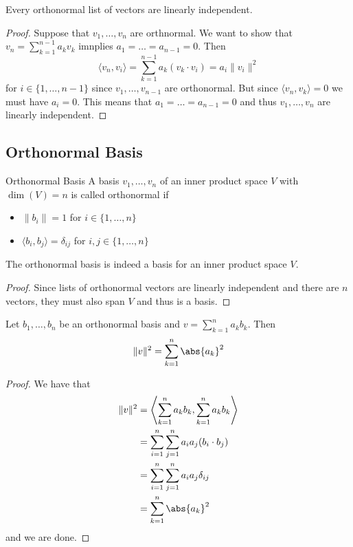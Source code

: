 \begin{prp}{}{} Every orthonormal list of vectors are linearly independent. \tcbline
\begin{proof}
Suppose that $v_1,\dots,v_n$ are orthnormal. We want to show that $v_n=\sum_{k=1}^{n-1}a_kv_k$ imnplies $a_1=\dots=a_{n-1}=0$. Then $$\langle v_n, v_i\rangle=\sum_{k=1}^{n-1}a_k(v_k\cdot v_i)=a_i\|v_i\|^2$$ for $i\in\{1,\dots,n-1\}$ since $v_1,\dots,v_{n-1}$ are orthonormal. But since $\langle v_n, v_k\rangle=0$ we must have $a_i=0$. This means that $a_1=\dots=a_{n-1}=0$ and thus $v_1,\dots,v_n$ are linearly independent. 
\end{proof}
\end{prp}

\subsection{Orthonormal Basis}
\begin{defn}{Orthonormal Basis}{} A basis $v_1,\dots,v_n$ of an inner product space $V$ with $\dim(V)=n$ is called orthonormal if 
\begin{itemize}
\item $\|b_i\|=1$ for $i\in\{1,\dots,n\}$
\item $\langle b_i,b_j\rangle=\delta_{ij}$ for $i,j\in\{1,\dots,n\}$
\end{itemize}
\end{defn}

\begin{prp}{}{} The orthonormal basis is indeed a basis for an inner product space $V$. \tcbline
\begin{proof}
Since lists of orthonormal vectors are linearly independent and there are $n$ vectors, they must also span $V$ and thus is a basis. 
\end{proof}
\end{prp}

\begin{thm}{}{} Let $b_1,\dots,b_n$ be an orthonormal basis and $v=\sum_{k=1}^na_kb_k$. Then $$\|v\|^2=\sum_{k=1}^n\abs{a_k}^2$$ \tcbline
\begin{proof}
We have that 
\begin{align*}
\|v\|^2&=\left\langle\sum_{k=1}^na_kb_k, \sum_{k=1}^na_kb_k\right\rangle \\
&=\sum_{i=1}^n\sum_{j=1}^na_ia_j(b_i\cdot b_j)\\
&=\sum_{i=1}^n\sum_{j=1}^na_ia_j\delta_{ij}\\
&=\sum_{k=1}^n\abs{a_k}^2
\end{align*}
and we are done. 
\end{proof}
\end{thm}

